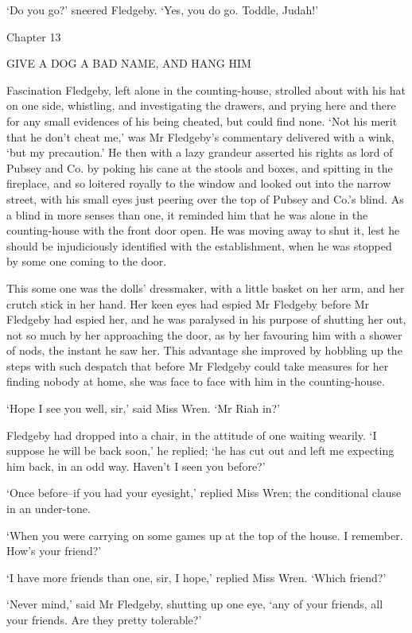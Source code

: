 ‘Do you go?’ sneered Fledgeby. ‘Yes, you do go. Toddle, Judah!’



Chapter 13

GIVE A DOG A BAD NAME, AND HANG HIM


Fascination Fledgeby, left alone in the counting-house, strolled about
with his hat on one side, whistling, and investigating the drawers, and
prying here and there for any small evidences of his being cheated,
but could find none. ‘Not his merit that he don’t cheat me,’ was Mr
Fledgeby’s commentary delivered with a wink, ‘but my precaution.’ He
then with a lazy grandeur asserted his rights as lord of Pubsey and
Co. by poking his cane at the stools and boxes, and spitting in the
fireplace, and so loitered royally to the window and looked out into the
narrow street, with his small eyes just peering over the top of Pubsey
and Co.’s blind. As a blind in more senses than one, it reminded him
that he was alone in the counting-house with the front door open. He was
moving away to shut it, lest he should be injudiciously identified with
the establishment, when he was stopped by some one coming to the door.

This some one was the dolls’ dressmaker, with a little basket on her
arm, and her crutch stick in her hand. Her keen eyes had espied Mr
Fledgeby before Mr Fledgeby had espied her, and he was paralysed in his
purpose of shutting her out, not so much by her approaching the door, as
by her favouring him with a shower of nods, the instant he saw her. This
advantage she improved by hobbling up the steps with such despatch that
before Mr Fledgeby could take measures for her finding nobody at home,
she was face to face with him in the counting-house.

‘Hope I see you well, sir,’ said Miss Wren. ‘Mr Riah in?’

Fledgeby had dropped into a chair, in the attitude of one waiting
wearily. ‘I suppose he will be back soon,’ he replied; ‘he has cut
out and left me expecting him back, in an odd way. Haven’t I seen you
before?’

‘Once before--if you had your eyesight,’ replied Miss Wren; the
conditional clause in an under-tone.

‘When you were carrying on some games up at the top of the house. I
remember. How’s your friend?’

‘I have more friends than one, sir, I hope,’ replied Miss Wren. ‘Which
friend?’

‘Never mind,’ said Mr Fledgeby, shutting up one eye, ‘any of your
friends, all your friends. Are they pretty tolerable?’

